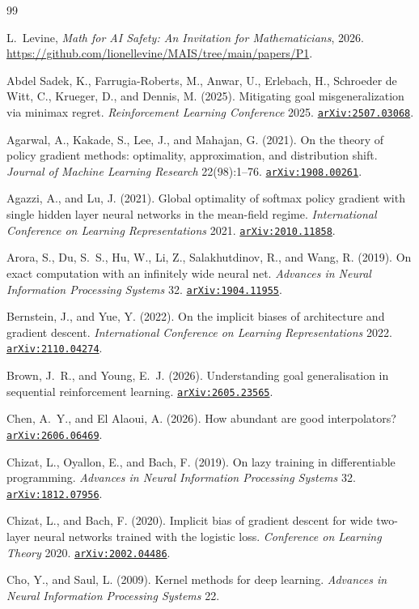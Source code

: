 \documentclass[11pt]{amsart}
\newcommand{\arxiv}[1]{\href{https://arxiv.org/abs/#1}{\texttt{arXiv:#1}}}
\theoremstyle{plain}
\theoremstyle{definition}
\begin{document}
\begin{thebibliography}{99}

L.~Levine,
\emph{Math for AI Safety: An Invitation for Mathematicians},
2026. \url{https://github.com/lionellevine/MAIS/tree/main/papers/P1}.


 Abdel Sadek, K., Farrugia-Roberts, M., Anwar, U., Erlebach, H., Schroeder de Witt, C., Krueger, D., and Dennis, M. (2025). Mitigating goal misgeneralization via minimax regret. \emph{Reinforcement Learning Conference} 2025. \arxiv{2507.03068}.

 Agarwal, A., Kakade, S., Lee, J., and Mahajan, G. (2021). On the theory of policy gradient methods: optimality, approximation, and distribution shift. \emph{Journal of Machine Learning Research} 22(98):1--76. \arxiv{1908.00261}.

 Agazzi, A., and Lu, J. (2021). Global optimality of softmax policy gradient with single hidden layer neural networks in the mean-field regime. \emph{International Conference on Learning Representations} 2021. \arxiv{2010.11858}.

 Arora, S., Du, S.~S., Hu, W., Li, Z., Salakhutdinov, R., and Wang, R. (2019). On exact computation with an infinitely wide neural net. \emph{Advances in Neural Information Processing Systems} 32. \arxiv{1904.11955}.

 Bernstein, J., and Yue, Y. (2022). On the implicit biases of architecture and gradient descent. \emph{International Conference on Learning Representations} 2022. \arxiv{2110.04274}.

 Brown, J.~R., and Young, E.~J. (2026). Understanding goal generalisation in sequential reinforcement learning. \arxiv{2605.23565}.

 Chen, A.~Y., and El Alaoui, A. (2026). How abundant are good interpolators? \arxiv{2606.06469}.

 Chizat, L., Oyallon, E., and Bach, F. (2019). On lazy training in differentiable programming. \emph{Advances in Neural Information Processing Systems} 32. \arxiv{1812.07956}.

 Chizat, L., and Bach, F. (2020). Implicit bias of gradient descent for wide two-layer neural networks trained with the logistic loss. \emph{Conference on Learning Theory} 2020. \arxiv{2002.04486}.

 Cho, Y., and Saul, L. (2009). Kernel methods for deep learning. \emph{Advances in Neural Information Processing Systems} 22.


\end{thebibliography}
\end{document}
